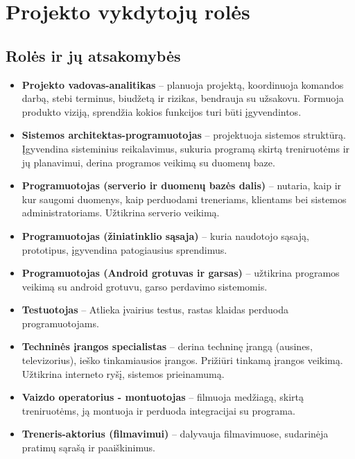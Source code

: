 









\section{Projekto vykdytojų rolės}






\subsection{Rolės ir jų atsakomybės}

\begin{itemize}
    \item \textbf{Projekto vadovas-analitikas} -- planuoja projektą, koordinuoja komandos darbą, stebi terminus, biudžetą ir rizikas, bendrauja su užsakovu. Formuoja produkto viziją, sprendžia kokios funkcijos turi būti įgyvendintos.
    \item \textbf{Sistemos architektas-programuotojas} -- projektuoja sistemos struktūrą. Įgyvendina sisteminius reikalavimus, sukuria programą skirtą treniruotėms ir jų planavimui, derina programos veikimą su duomenų baze.
    \item \textbf{Programuotojas (serverio ir duomenų bazės dalis)} -- nutaria, kaip ir kur saugomi duomenys, kaip perduodami treneriams, klientams bei sistemos administratoriams. Užtikrina serverio veikimą.
    \item \textbf{Programuotojas (žiniatinklio sąsaja)} -- kuria naudotojo sąsają, prototipus, įgyvendina patogiausius sprendimus.
    \item \textbf{Programuotojas (Android grotuvas ir garsas)} -- užtikrina programos veikimą su android grotuvu, garso perdavimo sistemomis. 
    \item \textbf{Testuotojas} -- Atlieka įvairius testus, rastas klaidas perduoda programuotojams.
    \item \textbf{Techninės įrangos specialistas} -- derina techninę įrangą (ausines, televizorius), ieško tinkamiausios įrangos. Prižiūri tinkamą įrangos veikimą. Užtikrina interneto ryšį, sistemos prieinamumą.
    \item \textbf{Vaizdo operatorius - montuotojas} -- filmuoja medžiagą, skirtą treniruotėms, ją montuoja ir perduoda integracijai su programa.
    \item \textbf{Treneris-aktorius (filmavimui)} -- dalyvauja filmavimuose, sudarinėja pratimų sąrašą ir paaiškinimus.


\end{itemize}
